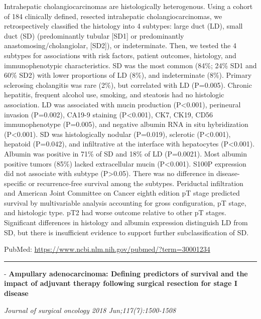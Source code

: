 \documentclass[]{article}
\begin{document}
Intrahepatic cholangiocarcinomas are histologically heterogenous. Using
a cohort of 184 clinically defined, resected intrahepatic
cholangiocarcinomas, we retrospectively classified the histology into 4
subtypes: large duct (LD), small duct (SD) (predominantly tubular
{[}SD1{]} or predominantly anastomosing/cholangiolar, {[}SD2{]}), or
indeterminate. Then, we tested the 4 subtypes for associations with risk
factors, patient outcomes, histology, and immunophenotypic
characteristics. SD was the most common (84\%; 24\% SD1 and 60\% SD2)
with lower proportions of LD (8\%), and indeterminate (8\%). Primary
sclerosing cholangitis was rare (2\%), but correlated with LD (P=0.005).
Chronic hepatitis, frequent alcohol use, smoking, and steatosis had no
histologic association. LD was associated with mucin production
(P\textless{}0.001), perineural invasion (P=0.002), CA19-9 staining
(P\textless{}0.001), CK7, CK19, CD56 immunophenotype (P=0.005), and
negative albumin RNA in situ hybridization (P\textless{}0.001). SD was
histologically nodular (P=0.019), sclerotic (P\textless{}0.001),
hepatoid (P=0.042), and infiltrative at the interface with hepatocytes
(P\textless{}0.001). Albumin was positive in 71\% of SD and 18\% of LD
(P=0.0021). Most albumin positive tumors (85\%) lacked extracellular
mucin (P\textless{}0.001). S100P expression did not associate with
subtype (P\textgreater{}0.05). There was no difference in
disease-specific or recurrence-free survival among the subtypes.
Periductal infiltration and American Joint Committee on Cancer eighth
edition pT stage predicted survival by multivariable analysis accounting
for gross configuration, pT stage, and histologic type. pT2 had worse
outcome relative to other pT stages. Significant differences in
histology and albumin expression distinguish LD from SD, but there is
insufficient evidence to support further subclassification of SD.

PubMed: \url{https://www.ncbi.nlm.nih.gov/pubmed/?term=30001234}

{}

{}

\begin{center}\rule{0.5\linewidth}{\linethickness}\end{center}

 - \textbf{Ampullary adenocarcinoma: Defining predictors of survival and
the impact of adjuvant therapy following surgical resection for stage I
disease}

\emph{Journal of surgical oncology 2018 Jun;117(7):1500-1508}
\end{document}
